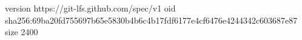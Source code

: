 version https://git-lfs.github.com/spec/v1
oid sha256:69ba20fd755697b65e5830b4b6c4b17fdf6177e4cf6476e4244342c603687e87
size 2400

